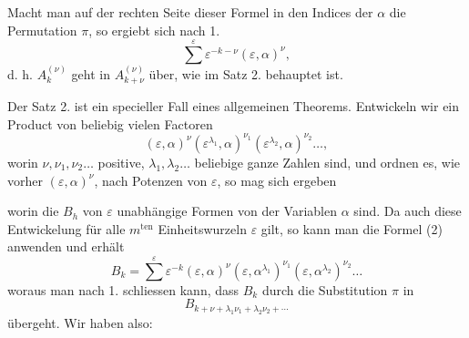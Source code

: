 
Macht man auf der rechten Seite dieser Formel in den Indices der $\alpha$ die Permutation $\pi$, so ergiebt sich nach 1.
\[
\sum^{\varepsilon} \varepsilon^{-k-\nu}(\varepsilon,\alpha)^{\nu},
\]
d. h. $A_k^{(\nu)}$ geht in $A_{k+\nu}^{(\nu)}$ über, wie im Satz 2. behauptet ist.

Der Satz 2. ist ein specieller Fall eines allgemeinen Theorems. Entwickeln wir ein Product von beliebig vielen Factoren
\[
(\varepsilon,\alpha)^{\nu}(\varepsilon^{\lambda_1},\alpha)^{\nu_1}(\varepsilon^{\lambda_2},\alpha)^{\nu_2}\dots,
\]
worin $\nu, \nu_1, \nu_2\dots$ positive, $\lambda_1, \lambda_2\dots$ beliebige ganze Zahlen sind, und ordnen es, wie vorher $(\varepsilon,\alpha)^{\nu}$, nach Potenzen von $\varepsilon$, so mag sich ergeben

worin die $B_h$ von $\varepsilon$ unabhängige Formen von der Variablen $\alpha$ sind. Da auch diese Entwickelung für alle $m^{\mathrm{ten}}$ Einheitswurzeln $\varepsilon$ gilt, so kann man die Formel (2) anwenden und erhält
\[
B_k = \sum^{\varepsilon} \varepsilon^{-k}(\varepsilon,\alpha)^{\nu}(\varepsilon,\alpha^{\lambda_1})^{\nu_1}(\varepsilon,\alpha^{\lambda_2})^{\nu_2}\dots
\]
woraus man nach 1. schliessen kann, dass $B_k$ durch die Substitution $\pi$ in
\[
B_{k+\nu+\lambda_1\nu_1+\lambda_2\nu_2+\cdots}
\]
übergeht. Wir haben also:


